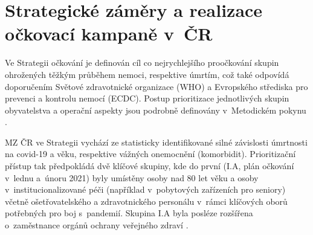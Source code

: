 




\section*{Strategické záměry a realizace \\ očkovací kampaně v~ČR}
\label{sec:strategie}

Ve Strategii očkování \cite{strategie_covid} je definován cíl co nejrychlejšího proočkování skupin ohrožených těžkým průběhem nemoci, respektive úmrtím, což také odpovídá doporučením Světové zdravotnické organizace (WHO) a Evropského střediska pro prevenci a kontrolu nemocí (ECDC). Postup prioritizace jednotlivých skupin obyvatelstva a operační aspekty jsou podrobně definovány v~Metodickém pokynu \cite{ockovani_mp}. %
%

MZ ČR ve Strategii vychází ze statisticky identifikované silné závislosti úmrtnosti na covid-19 a věku, respektive vážných onemocnění (komorbidit). Prioritizační pří\-stup tak předpokládá dvě klíčové skupiny, kde do první (I.A, plán očkování v~lednu a~únoru 2021) byly umístěny osoby nad 80 let věku a osoby v~institucionalizované péči (například v~pobytových zařízeních pro seniory) včetně ošetřovatelského a zdravotnického personálu v~rámci klíčových oborů potřebných pro boj s~pandemií. Skupina I.A byla posléze rozšířena o~zaměstnance orgánů ochrany veřejného zdraví \cite{prioritizace_hygiena}. 

